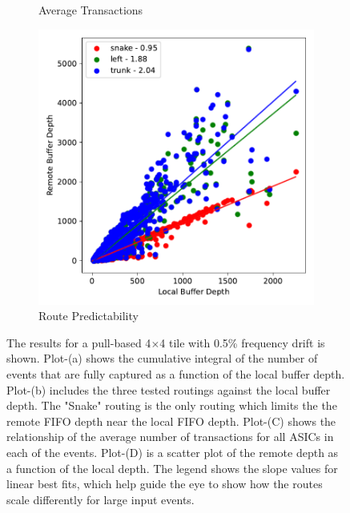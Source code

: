 \begin{figure}
\begin{subfigure}[b]{0.475\textwidth}
      \caption[]%
      {{\small Average Transactions}}    
  \end{subfigure}
  \hfill
  \begin{subfigure}[b]{0.475\textwidth}   
      \centering 
      \includegraphics[width=\textwidth]{./images/mp60_16_slow_route_fits.pdf}
      \caption[]%
      {{\small Route Predictability}}    
  \end{subfigure}
  \caption[]
  {\small The results for a pull-based 4$\times$4 tile with 0.5\% frequency drift is shown. 
  Plot-(a) shows the cumulative integral of the number of events that are fully captured as a function of the local buffer depth.
  Plot-(b) includes the three tested routings against the local buffer depth. 
  The "Snake" routing is the only routing which limits the the remote FIFO depth near the local FIFO depth.
  Plot-(C) shows the relationship of the average number of transactions for all ASICs in each of the events.
  Plot-(D) is a scatter plot of the remote depth as a function of the local depth.
  The legend shows the slope values for linear best fits, which help guide the eye to show how the routes scale differently for large input events.
  } 
  \label{fig:mp60_slow_plots_for_digital_sim}
\end{figure}

